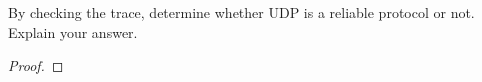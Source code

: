 \documentclass[../../main.tex]{subfiles}
\begin{document}
\begin{wts}
By checking the trace, determine whether UDP is a reliable protocol or not. Explain your answer.
\end{wts}
\begin{proof}



\end{proof}
\end{document}
